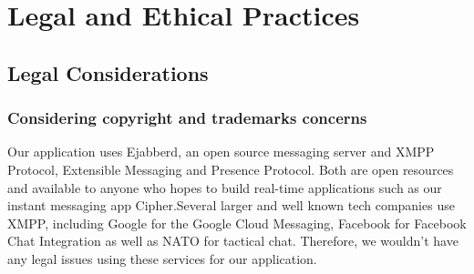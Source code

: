 \documentclass[12pt]{article}
\begin{document}



\section{Legal and Ethical Practices}\label{chap:ethics}

\subsection{Legal Considerations}\label{sec:legal}

\subsubsection{Considering copyright and trademarks concerns}
\RaggedRight Our application uses Ejabberd, an open source messaging server and XMPP Protocol, Extensible Messaging and Presence Protocol. Both are open resources and available to anyone who hopes to build real-time applications such as our instant messaging app Cipher.Several larger and well known tech companies use XMPP, including Google for the Google Cloud Messaging, Facebook for Facebook Chat Integration as well as NATO for tactical chat. Therefore, we wouldn’t have any legal issues using these services for our application. 
\end{document}
